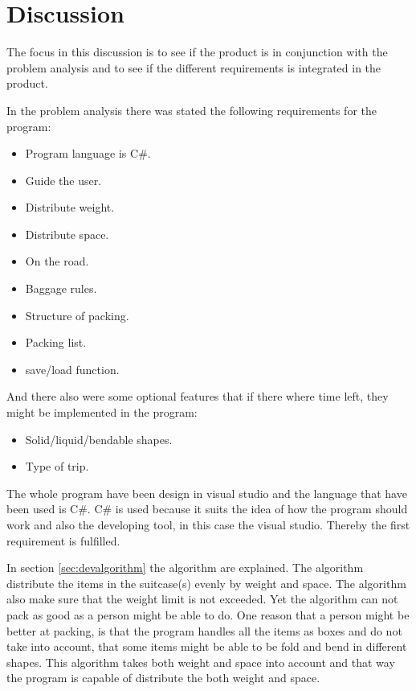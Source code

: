\section{Discussion}
The focus in this discussion is to see if the product is in conjunction with the problem analysis and to see if the different requirements is integrated in the product.

In the problem analysis there was stated the following requirements for the program:

\begin{itemize}
\item Program language is C\#.
\item Guide the user.
\item Distribute weight.
\item Distribute space.
\item On the road.
\item Baggage rules.
\item Structure of packing.
\item Packing list.
\item save/load function.
\end{itemize}

And there also were some optional features that if there where time left, they might be implemented in the program:
\begin{itemize}
\item Solid/liquid/bendable shapes.
\item Type of trip.
\end{itemize}

The whole program have been design in visual studio and the language that have been used is C\#. C\# is used because it suits the idea of how the program should work and also the developing tool, in this case the visual studio. Thereby the first requirement is fulfilled.

In section \ref{sec:devalgorithm} the algorithm are explained. The algorithm distribute the items in the suitcase(s) evenly by weight and space. The algorithm also make sure that the weight limit is not exceeded. Yet the algorithm can not pack as good as a person might be able to do. One reason that a person might be better at packing, is that the program handles all the items as boxes and do not take into account, that some items might be able to be fold and bend in different shapes. This algorithm takes both weight and space into account and that way the program is capable of distribute the both weight and space.

